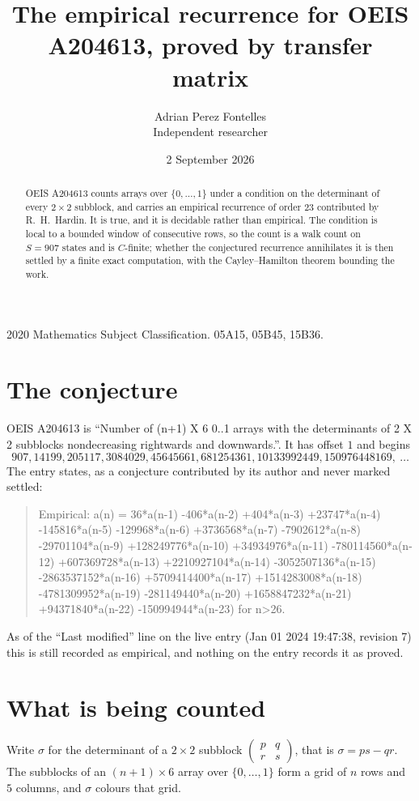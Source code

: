\documentclass[11pt,a4paper]{article}
\title{The empirical recurrence for OEIS A204613, proved by transfer matrix}
\author{Adrian Perez Fontelles\\ \small Independent researcher}
\date{2 September 2026}
\theoremstyle{plain}
\theoremstyle{definition}
\begin{document}
\maketitle

\begin{abstract}
OEIS A204613 counts arrays over $\{0,\dots,1\}$ under a condition on the determinant of every
$2\times2$ subblock, and carries an empirical recurrence of order $23$ contributed by
R.~H.~Hardin. It is true, and it is decidable rather than empirical. The condition is local to
a bounded window of consecutive rows, so the count is a walk count on $S=907$ states and is
$C$-finite; whether the conjectured recurrence annihilates it is then settled by a finite exact
computation, with the Cayley--Hamilton theorem bounding the work.
\end{abstract}

\noindent\small 2020 Mathematics Subject Classification. 05A15, 05B45, 15B36.\normalsize

\section{The conjecture}

OEIS A204613 is ``Number of (n+1) X 6 0..1 arrays with the determinants of 2 X 2 subblocks nondecreasing rightwards and downwards.''. It has offset $1$ and begins
\[
907, 14199, 205117, 3084029, 45645661, 681254361, 10133992449, 150976448169,\ \dots
\]
The entry states, as a conjecture contributed by its author and never marked settled:
\begin{quote}
Empirical: a(n) = 36*a(n-1) -406*a(n-2) +404*a(n-3) +23747*a(n-4) -145816*a(n-5) -129968*a(n-6) +3736568*a(n-7) -7902612*a(n-8) -29701104*a(n-9) +128249776*a(n-10) +34934976*a(n-11) -780114560*a(n-12) +607369728*a(n-13) +2210927104*a(n-14) -3052507136*a(n-15) -2863537152*a(n-16) +5709414400*a(n-17) +1514283008*a(n-18) -4781309952*a(n-19) -281149440*a(n-20) +1658847232*a(n-21) +94371840*a(n-22) -150994944*a(n-23) for n>26.
\end{quote}
As of the ``Last modified'' line on the live entry (Jan 01 2024 19:47:38, revision 7) this is still
recorded as empirical, and nothing on the entry records it as proved.

\section{What is being counted}

Write $\sigma$ for the determinant of a $2\times2$ subblock
$\begin{pmatrix}p&q\\r&s\end{pmatrix}$, that is $\sigma=ps-qr$. The subblocks of an
$(n+1)\times6$ array over $\{0,\dots,1\}$ form a grid of $n$ rows and $5$
columns, and $\sigma$ colours that grid.
\end{document}
